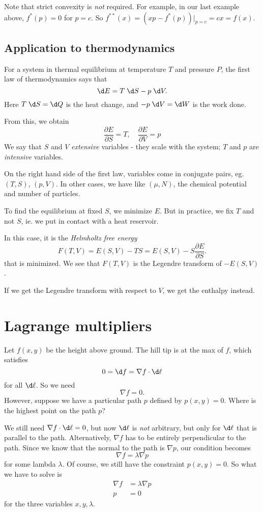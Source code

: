 \documentclass[a4paper]{article}
\begin{document}
Note that strict convexity is \emph{not} required. For example, in our last example above, $f^*(p) = 0$ for $p = c$. So $f^{**}(x) = (xp - f^*(p))|_{p = c} = cx = f(x)$.

\subsection{Application to thermodynamics}
For a system in thermal equilibrium at temperature $T$ and pressure $P$, the first law of thermodynamics says that
\[
  \d E = T\;\d S - p\;\d V.
\]
Here $T\;\d S = \d Q$ is the heat change, and $-p\;\d V = \d W$ is the work done.

From this, we obtain
\[
  \frac{\partial E}{\partial S} = T,\quad \frac{\partial E}{\partial V} = p
\]
We say that $S$ and $V$ \emph{extensive} variables - they scale with the system; $T$ and $p$ are \emph{intensive} variables.

On the right hand side of the first law, variables come in conjugate pairs, eg. $(T, S)$, $(p, V)$. In other cases, we have like $(\mu, N)$, the chemical potential and number of particles.

To find the equilibrium at fixed $S$, we minimize $E$. But in practice, we fix $T$ and not $S$, ie. we put in contact with a heat reservoir.

In this case, it is the \emph{Helmholtz free energy}
\[
  F(T, V) = E(S, V) - TS = E(S, V) - S\frac{\partial E}{\partial S}.
\]
that is minimized. We see that $F(T, V)$ is the Legendre transform of $-E(S, V)$.

If we get the Legendre transform with respect to $V$, we get the enthalpy instead.

\section{Lagrange multipliers}
Let $f(x, y)$ be the height above ground. The hill tip is at the max of $f$, which satisfies
\[
  0 = \d f = \nabla f\cdot \d \mathbf{\ell}
\]
for all $\d \mathbf{\ell}$. So we need
\[
  \nabla f = 0.
\]
However, suppose we have a particular path $p$ defined by $p(x, y) = 0$. Where is the highest point on the path $p$?

We still need $\nabla f \cdot \d \mathbf{\ell} = 0$, but now $\d \mathbf{\ell}$ is \emph{not} arbitrary, but only for $\d \ell$ that is parallel to the path. Alternatively, $\nabla f$ has to be entirely perpendicular to the path. Since we know that the normal to the path is $\nabla p$, our condition becomes
\[
  \nabla f = \lambda \nabla p
\]
for some lambda $\lambda$. Of course, we still have the constraint $p(x, y) = 0$. So what we have to solve is
\begin{align*}
  \nabla f &= \lambda \nabla p\\
  p &= 0
\end{align*}
for the three variables $x, y, \lambda$.
\end{document}
